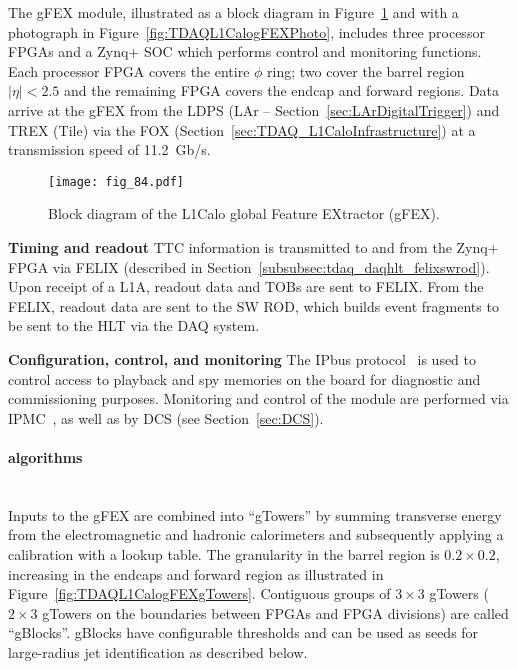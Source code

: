 \documentclass[cernpreprint, atlasdraft=false, UKenglish,british,orcidlogo, texmf, orcidlogo]{atlasdoc}
\begin{document}
The \gls{gFEX} module, illustrated as a block diagram in Figure~\ref{fig:TDAQL1CalogFEX} and with a photograph in Figure~\ref{fig:TDAQL1CalogFEXPhoto}, includes three processor \glspl{FPGA} and a Zynq+ \gls{SOC} which performs control and monitoring functions.  Each processor \gls{FPGA} covers the entire $\phi$ ring; two cover the barrel region $|\eta| < 2.5$ and the remaining \gls{FPGA} covers the endcap and forward regions.  Data arrive at the \gls{gFEX} from the \gls{LDPS} (LAr -- Section~\ref{sec:LArDigitalTrigger}) and \gls{TREX} (Tile) via the \gls{FOX} (Section~\ref{sec:TDAQ_L1CaloInfrastructure}) at a transmission speed of \SI{11.2}{Gb/\s}.
 
\begin{figure}[htbp]
\centerline{\texttt{[image: fig\_84.pdf]}}
\caption{Block diagram of the \gls{L1Calo} global Feature EXtractor (gFEX).}
\label{fig:TDAQL1CalogFEX}
\end{figure}
 
\textbf{Timing and readout}
\gls{TTC} information is transmitted to and from the Zynq+ \gls{FPGA} via \gls{FELIX} (described in Section~\ref{subsubsec:tdaq_daqhlt_felixswrod}).  Upon receipt of a \gls{L1A}, readout data and \glspl{TOB} are sent to \gls{FELIX}.  From the \gls{FELIX}, readout data are sent to the \gls{SW ROD}, which builds event fragments to be sent to the \gls{HLT} via the \gls{DAQ} system.
 
\textbf{Configuration, control, and monitoring}
The IPbus protocol~\cite{bib:IPbus} is used to control access to playback and spy memories on the board for diagnostic and commissioning purposes.  Monitoring and control of the module are performed via \gls{IPMC}~\cite{bib:CERN-IPMC}, as well as by \gls{DCS} (see Section~\ref{sec:DCS}).
 
\paragraph{ algorithms}\mbox{}\\
Inputs to the \gls{gFEX} are combined into ``gTowers'' by summing  transverse energy from the electromagnetic and hadronic calorimeters and
subsequently applying a calibration with a lookup table.
The granularity in the barrel region is $0.2 \times 0.2$, increasing in the endcaps and forward region as illustrated in Figure~\ref{fig:TDAQL1CalogFEXgTowers}.  Contiguous groups of $3 \times 3$ gTowers ($2 \times 3$ gTowers on the boundaries between \glspl{FPGA} and \gls{FPGA} divisions) are called ``gBlocks''. gBlocks have configurable thresholds and can be used as seeds for large-radius jet identification as described below.
 
\end{document}
